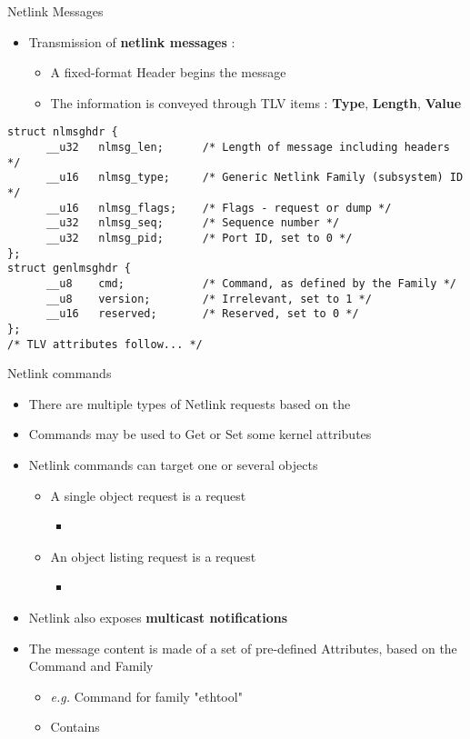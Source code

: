 \begin{frame}[fragile]{Netlink Messages}
	\begin{itemize}
		\item Transmission of \textbf{netlink messages} :
			\begin{itemize}
				\item A fixed-format Header begins the message
				\item The information is conveyed through TLV items : \textbf{Type}, \textbf{Length}, \textbf{Value}
			\end{itemize}
	\end{itemize}
	\begin{verbatim}
struct nlmsghdr {
      __u32   nlmsg_len;      /* Length of message including headers */
      __u16   nlmsg_type;     /* Generic Netlink Family (subsystem) ID */
      __u16   nlmsg_flags;    /* Flags - request or dump */
      __u32   nlmsg_seq;      /* Sequence number */
      __u32   nlmsg_pid;      /* Port ID, set to 0 */
};
struct genlmsghdr {
      __u8    cmd;            /* Command, as defined by the Family */
      __u8    version;        /* Irrelevant, set to 1 */
      __u16   reserved;       /* Reserved, set to 0 */
};
/* TLV attributes follow... */
	\end{verbatim}
\end{frame}

\begin{frame}{Netlink commands}
	\begin{itemize}
		\item There are multiple types of Netlink requests based on the 
		\item Commands may be used to Get or Set some kernel attributes 
		\item Netlink  commands can target one or several objects
			\begin{itemize}
				\item A single object request is a  request
					\begin{itemize}
						\item {}
					\end{itemize}
				\item An object listing request is a  request
					\begin{itemize}
						\item {}
					\end{itemize}
			\end{itemize}
		\item Netlink also exposes \textbf{multicast notifications}
		\item The message content is made of a set of pre-defined Attributes, based on the Command and Family
			\begin{itemize}
				\item \textit{e.g.} Command  for family "ethtool"
				\item Contains 
			\end{itemize}
	\end{itemize}
\end{frame}

